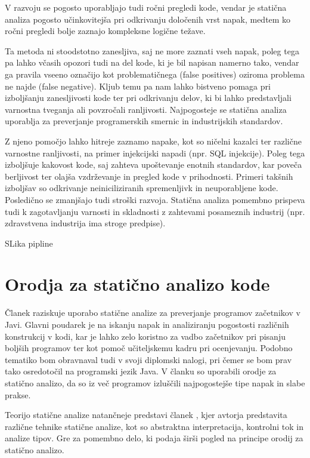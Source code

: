 \documentclass[a4paper,12pt,openright]{book}
\begin{document}
V razvoju se pogosto uporabljajo tudi ročni pregledi kode, vendar je statična analiza pogosto učinkovitejša pri odkrivanju določenih vrst napak, medtem ko ročni pregledi bolje zaznajo kompleksne logične težave.

Ta metoda ni stoodstotno zanesljiva, saj ne more zaznati vseh napak, poleg tega pa lahko včasih opozori tudi na del kode, ki je bil napisan namerno tako, vendar ga pravila vseeno označijo kot problematičnega (false positives) oziroma problema ne najde (false negative). Kljub temu pa nam lahko bistveno pomaga pri izboljšanju zanesljivosti kode ter pri odkrivanju delov, ki bi lahko predstavljali varnostna tveganja ali povzročali ranljivosti. Najpogosteje se statična analiza uporablja za preverjanje programerskih smernic in industrijskih standardov.

Z njeno pomočjo lahko hitreje zaznamo napake, kot so ničelni kazalci ter različne varnostne ranljivosti, na primer injekcijski napadi (npr. SQL injekcije). Poleg tega izboljšuje kakovost kode, saj zahteva upoštevanje enotnih standardov, kar poveča berljivost ter olajša vzdrževanje in pregled kode v prihodnosti. Primeri takšnih izboljšav so odkrivanje neiniciliziranih spremenljivk in neuporabljene kode. Posledično se zmanjšajo tudi stroški razvoja. Statična analiza pomembno prispeva tudi k zagotavljanju varnosti in skladnosti z zahtevami posameznih industrij (npr. zdravstvena industrija ima stroge predpise).

SLika pipline 

\section{Orodja za statično analizo kode}

Članek \textcite{truong2004static} raziskuje uporabo statične analize za preverjanje programov začetnikov v Javi. Glavni poudarek je na iskanju napak in analiziranju pogostosti različnih konstrukcij v kodi, kar je lahko zelo koristno za vadbo začetnikov pri pisanju boljših programov ter kot pomoč učiteljskemu kadru pri ocenjevanju. Podobno tematiko bom obravnaval tudi v svoji diplomski nalogi, pri čemer se bom prav tako osredotočil na programski jezik Java. V članku so uporabili orodje za statično analizo, da so iz več programov izluščili najpogostejše tipe napak in slabe prakse.

Teorijo statične analize natančneje predstavi članek \textcite{moller2012static}, kjer avtorja predstavita različne tehnike statične analize, kot so abstraktna interpretacija, kontrolni tok in analize tipov. Gre za pomembno delo, ki podaja širši pogled na principe orodij za statično analizo.
\end{document}
